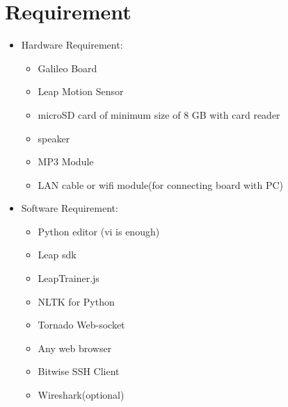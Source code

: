 \documentclass[11pt,a4paper]{article}
\begin{document}
	\section{Requirement}
	\vspace{1cm}
	\begin{itemize}
	    \item Hardware Requirement:
	    \begin{itemize}
	        \item Galileo Board
	        \item Leap Motion Sensor
	        \item microSD card of minimum size of 8 GB with card reader
	        \item speaker
	        \item MP3 Module
	        \item LAN cable or wifi module(for connecting board with PC)
	    \end{itemize}
	    \vspace{1cm}
	    \item Software Requirement:
	    \begin{itemize}
	        \item Python editor (vi is enough)
	        \item Leap sdk
	        \item LeapTrainer.js
	        \item NLTK for Python
	        \item Tornado Web-socket
	        \item Any web browser
	        \item Bitwise SSH Client
	        \item Wireshark(optional)
	    \end{itemize}
	\end{itemize}
	\newpage
\end{document}
